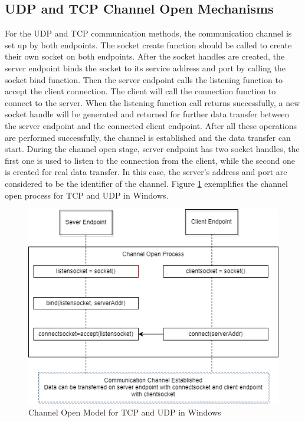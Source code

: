 \subsection{UDP and TCP Channel Open Mechanisms} 
For the UDP and TCP communication methods, the communication channel is set up by both endpoints. The socket create function should be called to create their own socket on both endpoints. After the socket handles are created, the server endpoint binds the socket to its service address and port by calling the socket bind function. Then the server endpoint calls the listening function to accept the client connection. The client will call the connection function to connect to the server. When the listening function call returns successfully, a new socket handle will be generated and returned for further data transfer between the server endpoint and the connected client endpoint. After all these operations are performed successfully, the channel is established and the data transfer can start. During the channel open stage, server endpoint has two socket handles, the first one is used to listen to the connection from the client, while the second one is created for real data transfer. In this case, the server's address and port are considered to be the identifier of the channel.  \cite{winsock}  Figure \ref{channelopen2} exemplifies the channel open process for TCP and UDP in Windows.
    
\begin{figure}[H]
\centerline{\includegraphics[scale=0.6]{Figures/tcpudpchannelopen}}
 \caption{Channel Open Model for TCP and UDP in Windows}
\label{channelopen2}    
\end{figure}

